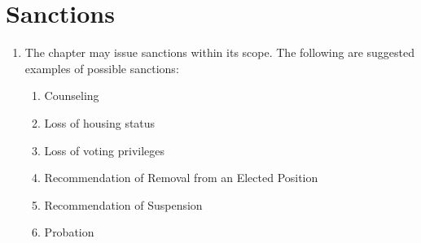 \section{Sanctions}
	
	\begin{enumerate}
		\item The chapter may issue sanctions within its scope. The following are suggested examples of possible sanctions:
			\begin{enumerate}
				\item Counseling
				\item Loss of housing status
				\item Loss of voting privileges
				\item Recommendation of Removal from an Elected Position
				\item Recommendation of Suspension
				\item Probation
			\end{enumerate}

	\end{enumerate}